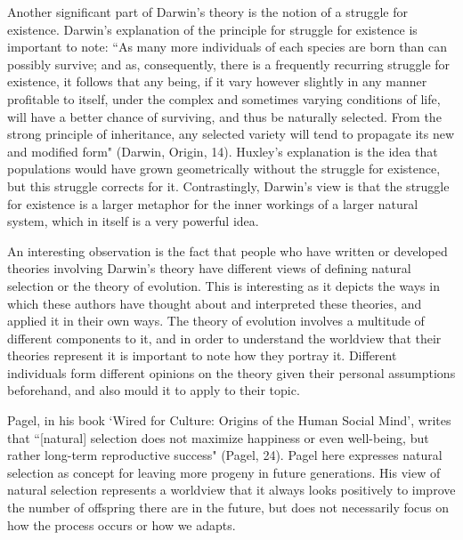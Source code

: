 \documentclass[11pt, oneside]{article}
\begin{document}
\par Another significant part of Darwin's theory is the notion of a struggle for existence. Darwin's explanation of the principle for struggle for existence is important to note: ``As many more individuals of each species are born than can possibly survive; and as, consequently, there is a frequently recurring struggle for existence, it follows that any being, if it vary however slightly in any manner profitable to itself, under the complex and sometimes varying conditions of life, will have a better chance of surviving, and thus be naturally selected. From the strong principle of inheritance, any selected variety will tend to propagate its new and modified form" (Darwin, Origin, 14). Huxley's explanation is the idea that populations would have grown geometrically without the struggle for existence, but this struggle corrects for it. Contrastingly, Darwin's view is that the struggle for existence is a larger metaphor for the inner workings of a larger natural system, which in itself is a very powerful idea.

\par An interesting observation is the fact that people who have written or developed theories involving Darwin's theory have different views of defining natural selection or the theory of evolution. This is interesting as it depicts the ways in which these authors have thought about and interpreted these theories, and applied it in their own ways. The theory of evolution involves a multitude of different components to it, and in order to understand the worldview that their theories represent it is important to note how they portray it. Different individuals form different opinions on the theory given their personal assumptions beforehand, and also mould it to apply to their topic.

\par Pagel, in his book `Wired for Culture: Origins of the Human Social Mind', writes that ``[natural] selection does not maximize happiness or even well-being, but rather long-term reproductive success" (Pagel, 24). Pagel here expresses natural selection as concept for leaving more progeny in future generations. His view of natural selection represents a worldview that it always looks positively to improve the number of offspring there are in the future, but does not necessarily focus on how the process occurs or how we adapts. 
\end{document}
